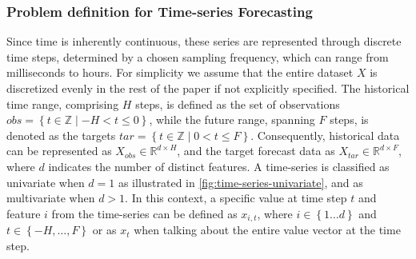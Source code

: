 \subsubsection{Problem definition for Time-series Forecasting} \label{sec:time-series_problem_definition}
Since time is inherently continuous, these series are represented through discrete time steps, determined by a chosen sampling frequency, which can range from milliseconds to hours. For simplicity we assume that the entire dataset $X$ is discretized evenly in the rest of the paper if not explicitly specified. The historical time range, comprising $H$ steps, is defined as the set of observations $obs = \left\{t \in \mathbb{Z} \mid -H < t \leq 0\right\}$, while the future range, spanning $F$ steps, is denoted as the targets $tar = \left\{t \in \mathbb{Z} \mid 0 < t \leq F\right\}$. Consequently, historical data can be represented as $X_{obs} \in \mathbb{R}^{d \times H}$, and the target forecast data as $X_{tar} \in \mathbb{R}^{d \times F}$, where $d$ indicates the number of distinct features. A time-series is classified as univariate when $d = 1$ as illustrated in \autoref{fig:time-series-univariate}, and as multivariate when $d > 1$. In this context, a specific value at time step $t$ and feature $i$ from the time-series can be defined as $x_{i,t}$, where $i \in \left\{1 \dots d\right\}$ and $t \in \left\{-H, \ldots, F\right\}$ or as $x_t$ when talking about the entire value vector at the time step.

